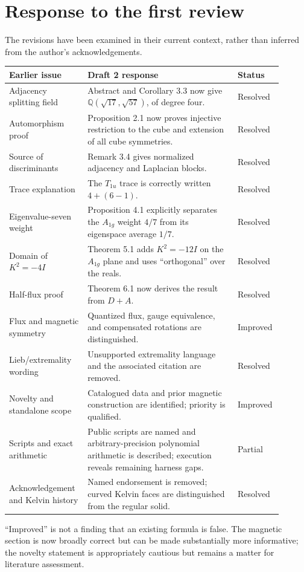 \documentclass[11pt,a4paper]{article}
\newcommand{\Q}{\mathbb Q}\newcommand{\C}{\mathbb C}\newcommand{\R}{\mathbb R}
\begin{document}
\section{Response to the first review}
The revisions have been examined in their current context, rather than inferred from the author's acknowledgements.
\begin{longtable}{>{\raggedright\arraybackslash}p{0.26\linewidth}>{\raggedright\arraybackslash}p{0.52\linewidth}>{\raggedright\arraybackslash}p{0.12\linewidth}}
\toprule
Earlier issue & Draft 2 response & Status\\\midrule
\endhead
Adjacency splitting field & Abstract and Corollary 3.3 now give $\Q(\sqrt{17},\sqrt{57})$, of degree four. & Resolved\\
Automorphism proof & Proposition 2.1 now proves injective restriction to the cube and extension of all cube symmetries. & Resolved\\
Source of discriminants & Remark 3.4 gives normalized adjacency and Laplacian blocks. & Resolved\\
Trace explanation & The $T_{1u}$ trace is correctly written $4+(6-1)$. & Resolved\\
Eigenvalue-seven weight & Proposition 4.1 explicitly separates the $A_{1g}$ weight $4/7$ from its eigenspace average $1/7$. & Resolved\\
Domain of $K^2=-4I$ & Theorem 5.1 adds $K^2=-12I$ on the $A_{1g}$ plane and uses ``orthogonal'' over the reals. & Resolved\\
Half-flux proof & Theorem 6.1 now derives the result from $D+A$. & Resolved\\
Flux and magnetic symmetry & Quantized flux, gauge equivalence, and compensated rotations are distinguished. & Improved\\
Lieb/extremality wording & Unsupported extremality language and the associated citation are removed. & Resolved\\
Novelty and standalone scope & Catalogued data and prior magnetic construction are identified; priority is qualified. & Improved\\
Scripts and exact arithmetic & Public scripts are named and arbitrary-precision polynomial arithmetic is described; execution reveals remaining harness gaps. & Partial\\
Acknowledgement and Kelvin history & Named endorsement is removed; curved Kelvin faces are distinguished from the regular solid. & Resolved\\\bottomrule
\end{longtable}
``Improved'' is not a finding that an existing formula is false. The magnetic section is now broadly correct but can be made substantially more informative; the novelty statement is appropriately cautious but remains a matter for literature assessment.
\end{document}

